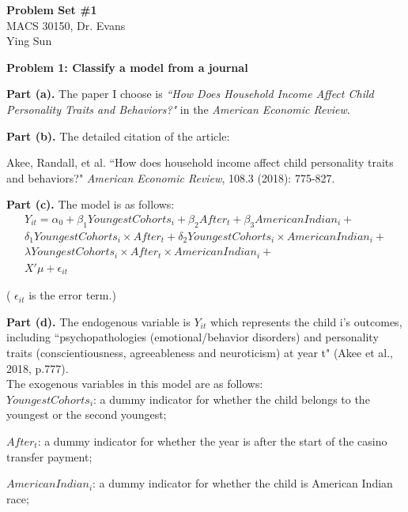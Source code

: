 \documentclass[letterpaper,12pt]{article}
\theoremstyle{definition}
\begin{document}
\begin{flushleft}
  \textbf{\large{Problem Set \#1}} \\
  MACS 30150, Dr. Evans \\
  Ying Sun
\end{flushleft}

\vspace{5mm}

\noindent\textbf{Problem 1: Classify a model from a journal}

\textbf{Part (a).} The paper I choose is \emph{``How Does Household Income Affect Child Personality Traits and Behaviors?"} in the \emph{American Economic Review}.

\textbf{Part (b).} The detailed citation of the article:

Akee, Randall, et al. ``How does household income affect child personality traits and behaviors?" \emph{American Economic Review}, 108.3 (2018): 775-827.

\textbf{Part (c).} The model is as follows: 
\begin{equation*}
\begin{split}
 Y_{it}= \alpha _{0} + \beta _{1}YoungestCohorts_{i} + \beta _{2}After_{t} + \beta _{3}AmericanIndian_{i} +\\
  \delta _{1}YoungestCohorts_{i} \times After_{t} + \delta _{2}YoungestCohorts_{i}\times AmericanIndian_{i} +\\
   \lambda YoungestCohorts_{i}\times After_{t}\times AmericanIndian_{i} +\\ {X}'\mu + \epsilon _{it}
\end{split}
\end{equation*}

( $ \epsilon _{it} $ is the error term.)

\textbf{Part (d).} The endogenous variable is $Y_{it}$ which represents the child i’s outcomes, including ``psychopathologies (emotional/behavior disorders) and personality traits (conscientiousness, agreeableness and neuroticism) at year t" (Akee et al., 2018, p.777).\\
The exogenous variables in this model are as follows:\\
$YoungestCohorts_{i}$: a dummy indicator for whether the child belongs to the youngest or the second youngest;

$After_{t}$: a dummy indicator for whether the year is after the start of the casino transfer payment;

$ AmericanIndian_{i} $: a dummy indicator for whether the child is American Indian race;
\end{document}

